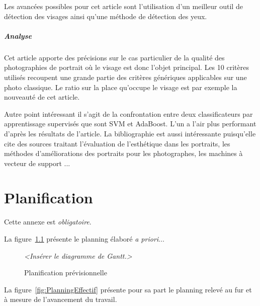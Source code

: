 \documentclass[11pt, french]{report-rd-info}
\begin{document}
Les avancées possibles pour cet article sont l’utilisation d’un meilleur outil de détection des visages ainsi qu’une méthode de détection des yeux.


\paragraph{Analyse}
Cet article apporte des précisions sur le cas particulier de la qualité des photographies de portrait où le visage est donc l’objet principal. Les 10 critères utilisés recoupent une grande partie des critères génériques applicables sur une photo classique. Le ratio sur la place qu’occupe le visage est par exemple la nouveauté de cet article. 

Autre point intéressant il s’agit de la confrontation entre deux classificateurs par apprentissage supervisés que sont SVM et AdaBoost. L’un a l’air plus performant d’après les résultats de l’article. La bibliographie est aussi intéressante puisqu’elle cite des sources traitant l’évaluation de l’esthétique dans les portraits, les méthodes d’améliorations des portraits pour les photographes, les machines à vecteur de support ...












\chapter{Planification}

Cette annexe est \emph{obligatoire}.

La figure~\ref{fig:PlanningPrevisionnel} présente le planning élaboré \emph{a priori}...

\begin{figure}
	\centering
		\emph{<Insérer le diagramme de Gantt.>}
	\caption{Planification prévisionnelle}
	\label{fig:PlanningPrevisionnel}
\end{figure}

La figure~\ref{fig:PlanningEffectif} présente pour sa part le planning relevé au fur et à mesure de l'avancement du travail.
\end{document}
